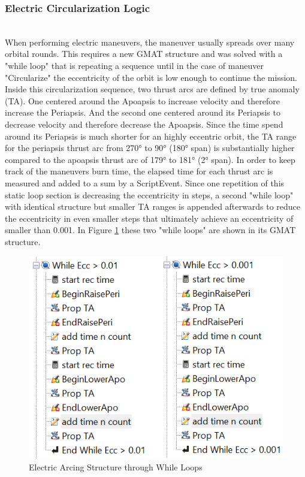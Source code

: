 \subsubsection{Electric Circularization Logic}
\
\\
When performing electric maneuvers, the maneuver usually spreads over many orbital rounds. This requires a new GMAT structure and was solved with a "while loop" that is repeating a sequence until in the case of maneuver "Circularize" the eccentricity of the orbit is low enough to continue the mission.
Inside this circularization sequence, two thrust arcs are defined by true anomaly (TA).
One centered around the Apoapsis to increase velocity and therefore increase the Periapsis. And the second one centered around its Periapsis to decrease velocity and therefore decrease the Apoapsis. Since the time spend around its Periapsis is much shorter for an highly eccentric orbit, the TA range for the periapsis thrust arc from 270° to 90° (180° span) is substantially higher compared to the apoapsis thrust arc of 179° to 181° (2° span).
In order to keep track of the maneuvers burn time, the elapsed time for each thrust arc is measured and added to a sum by a ScriptEvent. Since one repetition of this static loop section is decreasing the eccentricity in steps, a second "while loop" with identical structure but smaller TA ranges is appended afterwards to reduce the eccentricity in even smaller steps that ultimately achieve an eccentricity of smaller than 0.001. In Figure \ref{fig:gmat-loop} these two "while loops" are shown in its GMAT structure.

\begin{figure}[H]
  \centering
  \includegraphics[width=0.7\linewidth]{img/gmat_loop.png}
  \caption{Electric Arcing Structure through While Loops}
  \label{fig:gmat-loop}
\end{figure}

